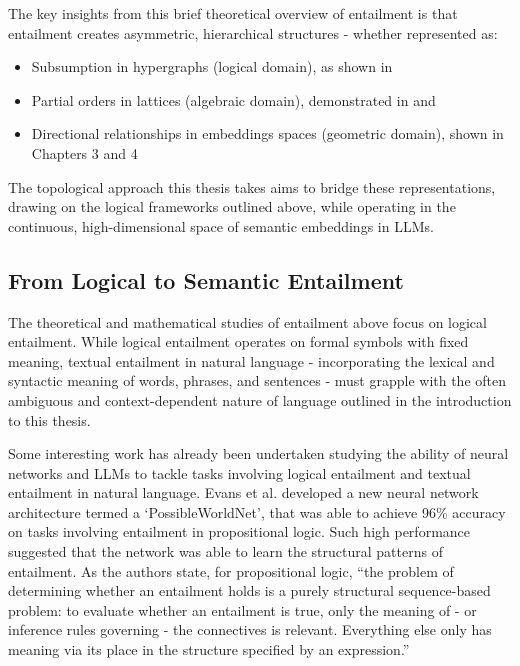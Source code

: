 \documentclass[12pt,twoside]{report}
\begin{document}
The key insights from this brief theoretical overview of entailment is that entailment creates asymmetric, hierarchical structures - whether represented as:
\begin{itemize}[itemsep=0pt]
    \item Subsumption in hypergraphs (logical domain), as shown in \cite{leibnizianAnalysis}
    \item Partial orders in lattices (algebraic domain), demonstrated in \cite{Cederquist} and \cite{leibnizianAnalysis}
    \item Directional relationships in embeddings spaces (geometric domain), shown in Chapters 3 and 4
\end{itemize}


The topological approach this thesis takes aims to bridge these representations, drawing on the logical frameworks outlined above, while operating in the continuous, high-dimensional space of semantic embeddings in LLMs.


\subsection{From Logical to Semantic Entailment}

The theoretical and mathematical studies of entailment above focus on logical entailment. While logical entailment operates on formal symbols with fixed meaning, textual entailment in natural language - incorporating the lexical and syntactic meaning of words, phrases, and sentences - must grapple with the often ambiguous and context-dependent nature of language outlined in the introduction to this thesis. \newline \par

Some interesting work has already been undertaken studying the ability of neural networks and LLMs to tackle tasks involving logical entailment and textual entailment in natural language. Evans et al. \cite{Evans2018} developed a new neural network architecture termed a `PossibleWorldNet', that was able to achieve 96\% accuracy on tasks involving entailment in propositional logic. Such high performance suggested that the network was able to learn the structural patterns of entailment. As the authors state, for propositional logic, ``the problem of determining whether an entailment holds is a purely structural sequence-based problem: to evaluate whether an entailment is true, only the meaning of - or inference rules governing - the connectives is relevant. Everything else only has meaning via its place in the structure specified by an expression.'' \cite{Evans2018} \newline \par
\end{document}
